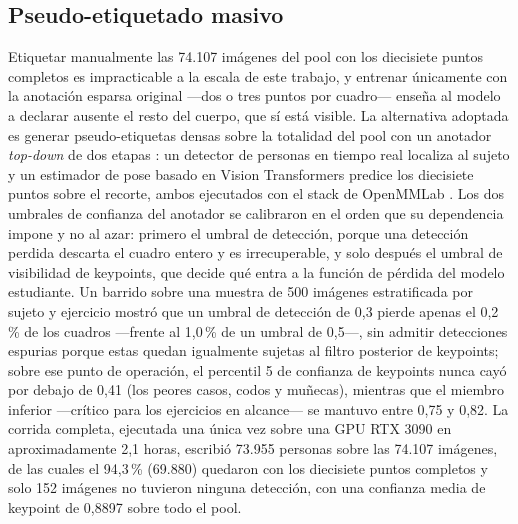 \documentclass[10pt,a4paper,twocolumn]{article}
\begin{document}
\subsection{Pseudo-etiquetado masivo}
Etiquetar manualmente las 74.107 imágenes del pool con los diecisiete puntos
completos es impracticable a la escala de este trabajo, y entrenar
únicamente con la anotación esparsa original —dos o tres puntos por
cuadro— enseña al modelo a declarar ausente el resto del cuerpo, que sí está
visible. La alternativa adoptada es generar pseudo-etiquetas densas sobre la
totalidad del pool con un anotador \emph{top-down} de dos etapas
\cite{lee2013}: un detector de personas en tiempo real \cite{lyu2022}
localiza al sujeto y un estimador de pose basado en Vision Transformers
\cite{xu2022} predice los diecisiete puntos sobre el recorte, ambos ejecutados
con el stack de OpenMMLab \cite{mmpose2020}. Los dos umbrales de confianza del
anotador se calibraron en el orden que su dependencia impone y no al azar:
primero el umbral de detección, porque una detección perdida descarta el
cuadro entero y es irrecuperable, y solo después el umbral de visibilidad de
keypoints, que decide qué entra a la función de pérdida del modelo
estudiante. Un barrido sobre una muestra de 500 imágenes estratificada por
sujeto y ejercicio mostró que un umbral de detección de 0,3 pierde apenas el
0,2\,\% de los cuadros —frente al 1,0\,\% de un umbral de 0,5—, sin admitir
detecciones espurias porque estas quedan igualmente sujetas al filtro
posterior de keypoints; sobre ese punto de operación, el percentil 5 de
confianza de keypoints nunca cayó por debajo de 0,41 (los peores casos, codos
y muñecas), mientras que el miembro inferior —crítico para los ejercicios en
alcance— se mantuvo entre 0,75 y 0,82. La corrida completa, ejecutada una
única vez sobre una GPU RTX 3090 en aproximadamente 2,1 horas, escribió
73.955 personas sobre las 74.107 imágenes, de las cuales el 94,3\,\%
(69.880) quedaron con los diecisiete puntos completos y solo 152 imágenes no
tuvieron ninguna detección, con una confianza media de keypoint de 0,8897
sobre todo el pool.
\end{document}
